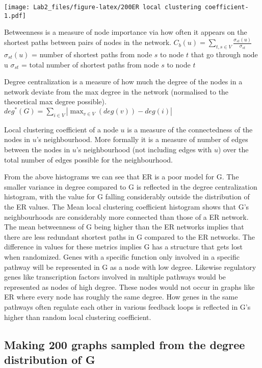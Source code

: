 \documentclass[]{article}
\begin{document}
\texttt{[image: Lab2\_files/figure-latex/200ER local clustering coefficient-1.pdf]}

Betweenness is a measure of node importance via how often it appears on
the shortest paths between pairs of nodes in the network.
\(\displaystyle C_b(u) = \sum_{t,s \in V}\frac{\sigma_{st}(u)}{\sigma_{st}}\)
\(\sigma_{st}(u)\) = number of shortest paths from node \(s\) to node
\(t\) that go through node u \(\sigma_{st}\) = total number of shortest
paths from node \(s\) to node \(t\)

Degree centralization is a measure of how much the degree of the nodes
in a network deviate from the max degree in the network (normalised to
the theoretical max degree possible).
\(\displaystyle deg^*(G) = \sum_{i\in V}|\max_{v \in V}(deg(v)) - deg(i)|\)

Local clustering coefficient of a node \(u\) is a measure of the
connectedness of the nodes in \(u\)'s neighbourhood. More formally it is
a measure of number of edges between the nodes in \(u\)'s neighbourhood
(not including edges with \(u\)) over the total number of edges possible
for the neighbourhood.

From the above histograms we can see that ER is a poor model for G. The
smaller variance in degree compared to G is reflected in the degree
centralization histogram, with the value for G falling considerably
outside the distribution of the ER values. The Mean local clustering
coefficient histogram shows that G's neighbourhoods are considerably
more connected than those of a ER network. The mean betweenness of G
being higher than the ER networks implies that there are less redundant
shortest paths in G compared to the ER networks. The difference in
values for these metrics implies G has a structure that gets lost when
randomized. Genes with a specific function only involved in a specific
pathway will be represented in G as a node with low degree. Likewise
regulatory genes like transcription factors involved in multiple
pathways would be represented as nodes of high degree. These nodes would
not occur in graphs like ER where every node has roughly the same
degree. How genes in the same pathways often regulate each other in
various feedback loops is reflected in G's higher than random local
clustering coefficient.

\subsection{Making 200 graphs sampled from the degree distribution of
G}\label{making-200-graphs-sampled-from-the-degree-distribution-of-g}
\end{document}
